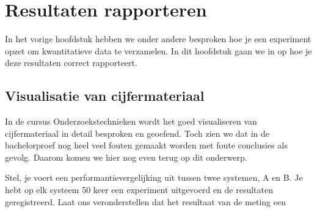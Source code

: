 \chapter{Resultaten rapporteren}
\label{ch:resultaten-rapporteren}

In het vorige hoofdstuk hebben we onder andere besproken hoe je een experiment opzet om kwantitatieve data te verzamelen. In dit hoofdstuk gaan we in op hoe je deze resultaten correct rapporteert.


\section{Visualisatie van cijfermateriaal}
\label{sec:visualisatie-cijfermateriaal}

In de cursus Onderzoekstechnieken wordt het goed visualiseren van cijfermateriaal in detail besproken en geoefend. Toch zien we dat in de bachelorproef nog heel veel fouten gemaakt worden met foute conclusies als gevolg. Daarom komen we hier nog even terug op dit onderwerp.


Stel, je voert een performantievergelijking uit tussen twee systemen, A en B. Je hebt op elk systeem 50 keer een experiment uitgevoerd en de resultaten geregistreerd. Laat ons veronderstellen dat het resultaat van de meting een 

